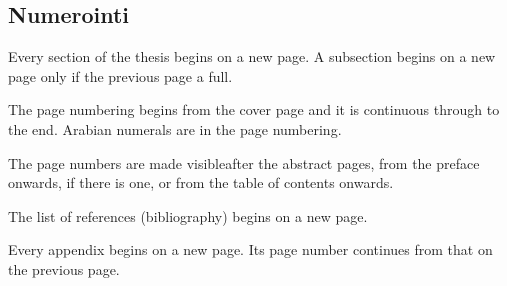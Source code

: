 \vspace{5mm}
{\hfill \ThesisAuthor \hspace{1cm}}

\newpage


\thesistableofcontents



\printnoidxglossary[type=symbolslist, style=long]

\printnoidxglossary[type=operatorslist, style=long]

\printnoidxglossary[type=\acronymtype, style=long, title={Abbreviations}] 

\cleardoublepage



\thispagestyle{empty}


\clearpage



\subsection*{Numerointi}

Every section of the thesis begins on a new page. A subsection begins on a new 
page only if the previous page a full.

The page numbering begins from the cover page and it is continuous through to 
the end. Arabian numerals are in the page numbering.

The page numbers are made visibleafter the abstract pages, from the preface 
onwards, if there is one, or from the table of contents onwards.

The list of references (bibliography) begins on a new page.

Every appendix begins on a new page. Its page number continues from that on the
previous page.

